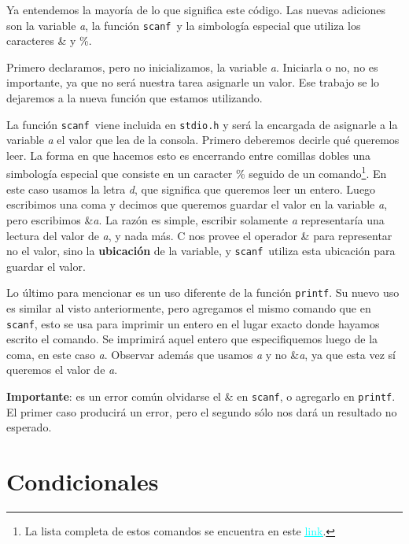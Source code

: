 \documentclass[10pt]{article}
\newcommand{\cscanf}[0]{\lstinline{scanf}}
\newcommand{\cprintf}[0]{\lstinline{printf}}
\begin{document}
\bigskip

Ya entendemos la mayoría de lo que significa este código. Las nuevas adiciones son la variable \textit{a}, la función \cscanf\ y la simbología especial que utiliza los caracteres \& y \%.

\bigskip

Primero declaramos, pero no inicializamos, la variable \textit{a}. Iniciarla o no, no es importante, ya que no será nuestra tarea asignarle un valor. Ese trabajo se lo dejaremos a la nueva función que estamos utilizando.

\bigskip

La función \cscanf\ viene incluida en \lstinline{stdio.h} y será la encargada de asignarle a la variable \textit{a} el valor que lea de la consola. Primero deberemos decirle qué queremos leer. La forma en que hacemos esto es encerrando entre comillas dobles una simbología especial que consiste en un caracter \% seguido de un comando\footnote{La lista completa de estos comandos se encuentra en este \href{http://agora.pucp.edu.pe/inf2170681/3.htm}{\textcolor{cyan}{\underline{link}}}.}. En este caso usamos la letra \textit{d}, que significa que queremos leer un entero. Luego escribimos una coma y decimos que queremos guardar el valor en la variable \textit{a}, pero escribimos \&\textit{a}. La razón es simple, escribir solamente \textit{a} representaría una lectura del valor de \textit{a}, y nada más. C nos provee el operador \& para representar no el valor, sino la \textbf{ubicación} de la variable, y \cscanf\ utiliza esta ubicación para guardar el valor.

\bigskip

Lo último para mencionar es un uso diferente de la función \cprintf. Su nuevo uso es similar al visto anteriormente, pero agregamos el mismo comando que en \cscanf, esto se usa para imprimir un entero en el lugar exacto donde hayamos escrito el comando. Se imprimirá aquel entero que especifiquemos luego de la coma, en este caso \textit{a}. Observar además que usamos \textit{a} y no \&\textit{a}, ya que esta vez sí queremos el valor de \textit{a}.

\bigskip

\textbf{Importante}: es un error común olvidarse el \& en \cscanf, o agregarlo en \cprintf. El primer caso producirá un error, pero el segundo sólo nos dará un resultado no esperado.

\section{Condicionales}
\end{document}
